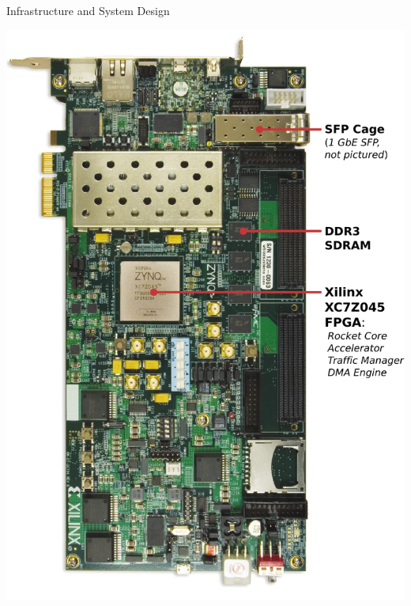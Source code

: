 \begin{block}{Infrastructure and System Design}
\begin{multicols}{2}
    \includegraphics[width=\linewidth]{img/zc706.pdf}
\end{multicols}

\end{block}


